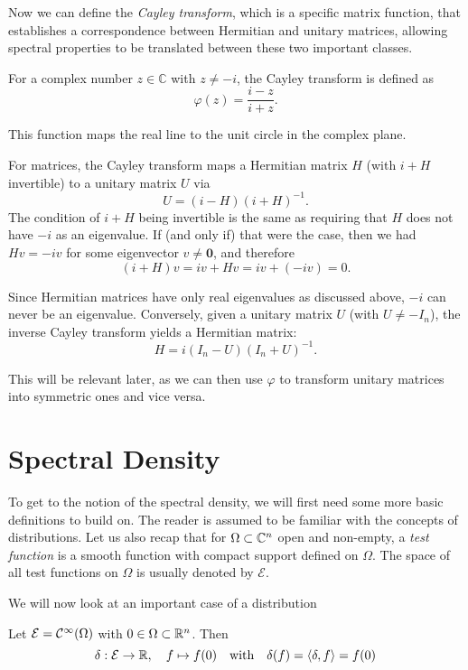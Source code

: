Now we can define the \emph{Cayley transform}, which is a specific matrix function, 
that establishes a correspondence between Hermitian and unitary matrices,
allowing spectral properties to be translated between these two important classes.

For a complex number $z \in \mathbb{C}$ with $z \neq -i$, the Cayley transform is defined as
\[
\varphi(z) = \frac{i - z}{i + z}.
\]

This function maps the real line to the unit circle in the complex plane.

\vspace{0.5cm}



For matrices, the Cayley transform maps a Hermitian matrix $H$ (with $i + H$ invertible) to a unitary matrix $U$ via
\[
U = (i - H)(i + H)^{-1}.
\]
The condition of $i + H$ being invertible is the same as requiring that $H$ does not have $-i$ as an eigenvalue.
If (and only if) that were the case, then we had $H v = -i v$ for some eigenvector $v \neq \mathbf{0}$,
and therefore 
\[
(i + H) v = i v + H v = i v + (-i v) = 0.
\]

Since Hermitian matrices have only real eigenvalues as discussed above, $-i$ can never be an eigenvalue.
Conversely, given a unitary matrix $U$ (with $U \neq -I_n$),
the inverse Cayley transform yields a Hermitian matrix:
\[
H = i (I_n - U)(I_n + U)^{-1}.
\]

This will be relevant later, as we can then use $\varphi$ to transform unitary matrices into symmetric ones and vice versa.

\section{Spectral Density}

To get to the notion of the spectral density,
we will first need some more basic definitions to build on.
The reader is assumed to be familiar with the concepts of distributions.
Let us also recap that for $\Omega \subset \mathbb{C}^n$ open and non-empty,
a \emph{test function} is a smooth function with compact support defined on $\Omega$.
The space of all test functions on $\Omega$ is usually denoted by $\mathcal{E}$.

We will now look at an important case of a distribution

\begin{definition}
    Let $\mathcal{E} = \mathcal{C}^{\infty}(\Omega)$ with $0 \in \Omega \subset \mathbb{R}^n$.
    Then
    $$\delta: \mathcal{E} \to \mathbb{R}, \quad f \mapsto f(0) \quad \text{with} \quad \delta(f) = \langle \delta, f \rangle = f(0)$$
\end{definition}


